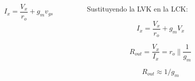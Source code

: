 \begin{frame}[t]
\begin{columns}
\begin{column}{0.5\textwidth}
            \[ I_x = \dfrac{V_x}{r_o} + g_m v_{gs} \]
        \end{column}
        \begin{column}{0.5\textwidth}
            \vspace{3mm}
            Sustituyendo la LVK en la LCK:

            \[ I_x = \dfrac{V_x}{r_o} + g_m V_x \]

            \[ \boxed{R_{out} = \dfrac{V_x}{I_x} = r_o \parallel \dfrac{1}{g_m}}  \]

            \[ \boxed{R_{out} \approx 1/g_m} \]
        \end{column}
    \end{columns}
\end{frame}

